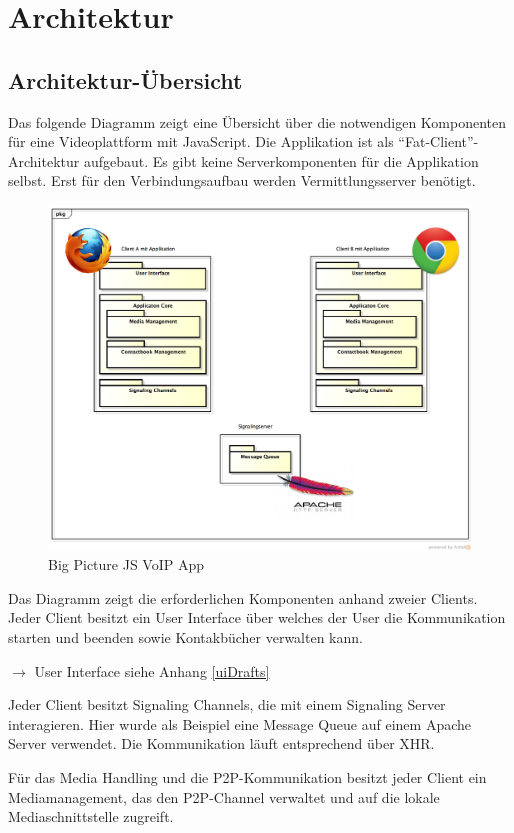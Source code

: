 \chapter{Architektur}

\section{Architektur-Übersicht}
	Das folgende Diagramm zeigt eine Übersicht über die notwendigen Komponenten für eine Videoplattform mit JavaScript. Die Applikation ist als "`Fat-Client"'-Architektur aufgebaut. Es gibt keine Serverkomponenten für die Applikation selbst. Erst für den Verbindungsaufbau werden Vermittlungsserver benötigt.
	\begin{figure}[H]
		\centering
		\includegraphics[width=1\textwidth]{../architekturanalayse/img/bigPicture.png}
		\caption{Big Picture JS VoIP App}
	\end{figure}
	Das Diagramm zeigt die erforderlichen Komponenten anhand zweier Clients. Jeder Client besitzt ein User Interface über welches der User die Kommunikation starten und beenden sowie Kontakbücher verwalten kann.
	
	$\rightarrow$ User Interface siehe Anhang \ref{uiDrafts}
	
	Jeder Client besitzt Signaling Channels, die mit einem Signaling Server interagieren. Hier wurde als Beispiel eine Message Queue auf einem Apache Server verwendet. Die Kommunikation läuft entsprechend über XHR.
	
	Für das Media Handling und die P2P-Kommunikation besitzt jeder Client ein Mediamanagement, das den P2P-Channel verwaltet und auf die lokale Mediaschnittstelle zugreift.
	

